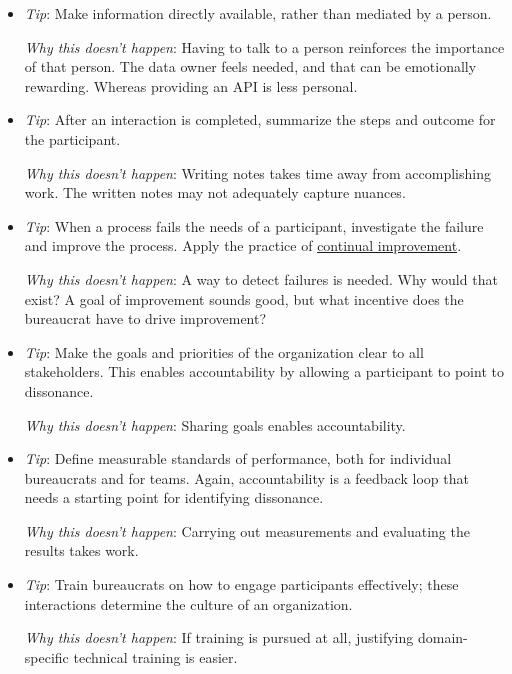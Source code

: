 \begin{itemize}
    \item \textit{Tip}: Make information directly available, rather than mediated by a person. 

    \textit{Why this doesn't happen}: Having to talk to a person reinforces the importance of that person. The data owner feels needed, and that can be emotionally rewarding. Whereas providing an API is less personal. 
    
    \item \textit{Tip}: After an interaction is completed, summarize the steps and outcome for the participant. 

    \textit{Why this doesn't happen}: Writing notes takes time away from accomplishing work. The written notes may not adequately capture nuances.
    
    \item \textit{Tip}: When a process fails the needs of a participant, investigate the failure and improve the process. Apply the practice of \href{https://en.wikipedia.org/wiki/Continual_improvement_process}{continual improvement}.    

    \textit{Why this doesn't happen}: A way to detect failures is needed. Why would that exist? A goal of improvement sounds good, but what incentive does the bureaucrat have to drive improvement?
    
    \item \textit{Tip}: Make the goals and priorities of the organization clear to all stakeholders. This enables accountability by allowing a participant to point to dissonance.  

    \textit{Why this doesn't happen}: Sharing goals enables accountability. 
    
    \item \textit{Tip}: Define measurable standards of performance, both for individual bureaucrats and for teams. Again, accountability is a feedback loop that needs a starting point for identifying dissonance.

    \textit{Why this doesn't happen}: Carrying out measurements and evaluating the results takes work. 
    
    \item \textit{Tip}: Train bureaucrats on how to engage participants effectively; these interactions determine the culture of an organization. 

    \textit{Why this doesn't happen}: If training is pursued at all, justifying domain-specific technical training is easier. 
    

\end{itemize}
